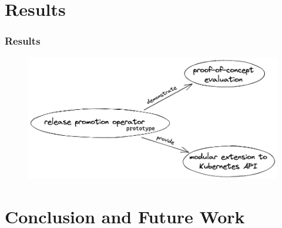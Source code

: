 \documentclass{beamer}
\begin{document}
\section{Results}

\begin{frame}
\frametitle{Results}

\begin{figure}[h]
	\centering
	\includegraphics[width=1.0\linewidth]{assets/results-illustration-release-promotion-operator.png}
	\label{fig:resultsIllustrationReleasePromotionOperator}	
\end{figure}


\end{frame}


\section{Conclusion and Future Work}
\end{document}
